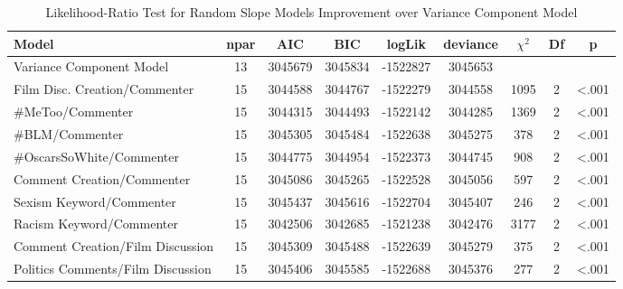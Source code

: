 \begin{table}[tb]
\begin{threeparttable}
\caption{Likelihood-Ratio Test for Random Slope Models Improvement over Variance Component Model} 
\label{tab:Slope}
\begingroup{}
\begin{tabular}{l @{}S[table-format=2.0]@{} *{4}{@{}S[table-format=-7.0]@{}} @{ }S[table-format=4.0]@{} @{ }S[table-format=2.0]@{} @{ }S[table-format=<.3]@{}}
  \toprule
Model & {npar} & {AIC} & {BIC} & {logLik} & {deviance} & {$\chi^2$} & {Df} & {p} \\ 
  \midrule
Variance Component Model & 13 & 3045679 & 3045834 & -1522827 & 3045653 &  &  &  \\ 
  Film Disc. Creation/Commenter & 15 & 3044588 & 3044767 & -1522279 & 3044558 & 1095 & 2 & <.001 \\ 
  \#MeToo/Commenter & 15 & 3044315 & 3044493 & -1522142 & 3044285 & 1369 & 2 & <.001 \\ 
  \#BLM/Commenter & 15 & 3045305 & 3045484 & -1522638 & 3045275 & 378 & 2 & <.001 \\ 
  \#OscarsSoWhite/Commenter & 15 & 3044775 & 3044954 & -1522373 & 3044745 & 908 & 2 & <.001 \\ 
  Comment Creation/Commenter & 15 & 3045086 & 3045265 & -1522528 & 3045056 & 597 & 2 & <.001 \\ 
  Sexism Keyword/Commenter & 15 & 3045437 & 3045616 & -1522704 & 3045407 & 246 & 2 & <.001 \\ 
  Racism Keyword/Commenter & 15 & 3042506 & 3042685 & -1521238 & 3042476 & 3177 & 2 & <.001 \\ 
  Comment Creation/Film Discussion & 15 & 3045309 & 3045488 & -1522639 & 3045279 & 375 & 2 & <.001 \\ 
  Politics Comments/Film Discussion & 15 & 3045406 & 3045585 & -1522688 & 3045376 & 277 & 2 & <.001 \\ 
   \bottomrule
\end{tabular}
\endgroup
\end{threeparttable}
\end{table}

